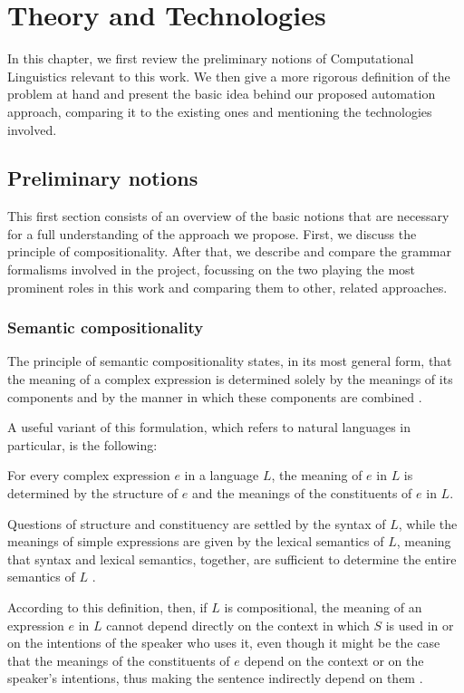 \chapter{Theory and Technologies} \label{ch2} 
In this chapter, we first review the preliminary notions of Computational Linguistics relevant to this work. We then give a more rigorous definition of the problem at hand and present the basic idea behind our proposed automation approach, comparing it to the existing ones and mentioning the technologies involved.

\section{Preliminary notions}
This first section consists of an overview of the basic notions that are necessary for a full understanding of the approach we propose. First, we discuss the principle of compositionality. After that, we describe and compare the grammar formalisms involved in the project, focussing on the two playing the most prominent roles in this work and comparing them to other, related approaches.

\subsection{Semantic compositionality}
The principle of semantic compositionality states, in its most general form, that the meaning of a complex expression is determined solely by the meanings of its components and by the manner in which these components are combined \cite{frege}. \smallskip 

A useful variant of this formulation, which refers to natural languages in particular, is the following: \smallskip

\begin{definition} \label{sc}
For every complex expression $e$ in a language $L$, the meaning of $e$ in $L$ is determined by the structure of $e$ and the meanings of the constituents of $e$ in $L$.
\end{definition}
\smallskip

Questions of structure and constituency are settled by the syntax of $L$, while the meanings of simple expressions are given by the lexical semantics of $L$, meaning that syntax and lexical semantics, together, are sufficient to determine the entire semantics of $L$ \cite{frege}. \smallskip

According to this definition, then, if $L$ is compositional, the meaning of an expression $e$ in $L$ cannot depend directly on the context in which $S$ is used in or on the intentions of the speaker who uses it, even though it might be the case that the meanings of the constituents of $e$ depend on the context or on the speaker's intentions, thus making the sentence indirectly depend on them \cite{semcom2}. \smallskip


